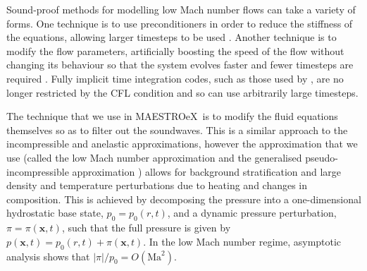 \documentclass[a4paper]{jpconf}
\newcommand{\maestroex}{{\sffamily MAESTROeX}}
\begin{document}
Sound-proof methods for modelling low Mach number flows can take a variety of forms. One technique is to use preconditioners in order to reduce the stiffness of the equations, allowing larger timesteps to be used \cite{Miczek2014,Barsukow2016}. Another technique is to modify the flow parameters, artificially boosting the speed of the flow without changing its behaviour so that the system evolves faster and fewer timesteps are required \citep{Rempel2005,Hotta2012}. Fully implicit time integration codes, such as those used by \cite{Viallet2011,Viallet2015,Goffrey2016}, are no longer restricted by the CFL condition and so can use arbitrarily large timesteps.

The technique that we use in \maestroex~is to modify the fluid equations themselves so as to filter out the soundwaves. This is a similar approach to the incompressible \cite{Boussinesq1901} and anelastic \cite{Ogura1962a,Gough1968,Durran1989} approximations, however the approximation that we use (called the low Mach number approximation \cite{Day2000,Almgren2006a,Nonaka2010} and the generalised pseudo-incompressible approximation \cite{Vasil2013}) allows for background stratification and large density and temperature perturbations due to heating and changes in composition. This is achieved by decomposing the pressure into a one-dimensional hydrostatic base state, $p_0 = p_0(r, t)$, and a dynamic pressure perturbation, $\pi = \pi(\bm{x}, t)$, such that the full pressure is given by $p(\bm{x}, t) = p_0(r, t) + \pi(\bm{x}, t)$. In the low Mach number regime, asymptotic analysis shows that $|\pi|/p_0 = O(\mathrm{Ma}^2)$. 
\end{document}
